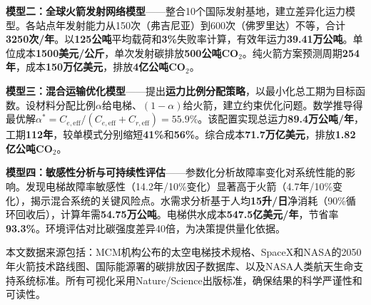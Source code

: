 \textbf{模型二：全球火箭发射网络模型}——整合10个国际发射基地，建立差异化运力模型。各站点年发射能力从150次（弗吉尼亚）到600次（佛罗里达）不等，合计\textbf{3250次/年}。以\textbf{125公吨}平均载荷和\textbf{3\%}失败率计算，有效年运力\textbf{39.41万公吨}。单位成本\textbf{1500美元/公斤}，单次发射碳排放\textbf{500公吨CO$_2$}。纯火箭方案预测周期\textbf{254年}，成本\textbf{150万亿美元}，排放\textbf{4亿公吨CO$_2$}。

\textbf{模型三：混合运输优化模型}——提出\textbf{运力比例分配策略}，以最小化总工期为目标函数。设材料分配比例$\alpha$给电梯、$(1-\alpha)$给火箭，建立约束优化问题。数学推导得最优解$\alpha^* = C_{e,\text{eff}}/(C_{e,\text{eff}}+C_{r,\text{eff}}) = 55.9\%$。该配置实现总运力\textbf{89.4万公吨/年}，工期\textbf{112年}，较单模式分别缩短\textbf{41\%}和\textbf{56\%}。综合成本\textbf{71.7万亿美元}，排放\textbf{1.82亿公吨CO$_2$}。

\textbf{模型四：敏感性分析与可持续性评估}——参数化分析故障率变化对系统性能的影响。发现电梯故障率敏感性（14.2年/10\%变化）显著高于火箭（4.7年/10\%变化），揭示混合系统的关键风险点。水需求分析基于人均\textbf{15升/日}净消耗（90\%循环回收后），计算年需\textbf{54.75万公吨}。电梯供水成本\textbf{547.5亿美元/年}，节省率\textbf{93.3\%}。环境评估对比碳强度差异40倍，为决策提供量化依据。

本文数据来源包括：MCM机构公布的太空电梯技术规格、SpaceX和NASA的2050年火箭技术路线图、国际能源署的碳排放因子数据库、以及NASA人类航天生命支持系统标准。所有可视化采用Nature/Science出版标准，确保结果的科学严谨性和可读性。
